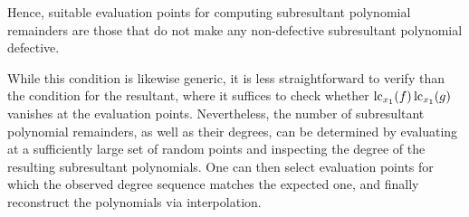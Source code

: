 Hence, suitable evaluation points for computing subresultant polynomial remainders are those that do not make any non-defective subresultant polynomial defective.

While this condition is likewise generic, it is less straightforward to verify than the condition for the resultant, where it suffices to check whether $\operatorname{lc}_{x_1}(f)\operatorname{lc}_{x_1}(g)$ vanishes at the evaluation points. Nevertheless, the number of subresultant polynomial remainders, as well as their degrees, can be determined by evaluating at a sufficiently large set of random points and inspecting the degree of the resulting subresultant polynomials. One can then select evaluation points for which the observed degree sequence matches the expected one, and finally reconstruct the polynomials via interpolation.
